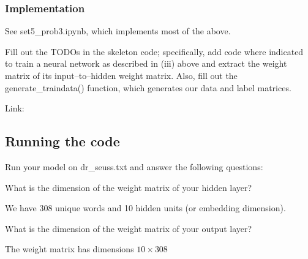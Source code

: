 \subsubsection{Implementation}

See set5_prob3.ipynb, which implements most of the above.

\problem[10]
Fill out the TODOs in the skeleton code; specifically, add code where indicated to train a neural network as described in (iii) above and extract the weight matrix of its input--to--hidden weight matrix. Also, fill out the generate\_traindata() function, which generates our data and label matrices.


\begin{solution}
 Link:
\end{solution}

\subsection{Running the code}
Run your model on dr_seuss.txt and answer the following questions:

\problem[2]
What is the dimension of the weight matrix of your hidden layer?

\begin{solution}
 We have 308 unique words and 10 hidden units (or embedding dimension).
\end{solution}

\problem[2]
What is the dimension of the weight matrix of your output layer?
\begin{solution}
 The weight matrix has dimensions $10\times 308$
\end{solution}

